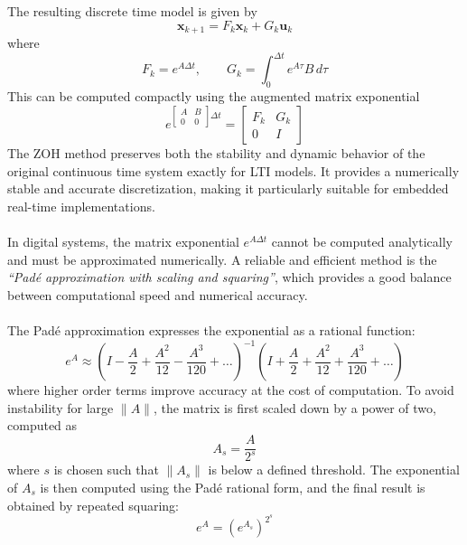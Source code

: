 \\ \\
The resulting discrete time model is given by
$$
    \mathbf{x}_{k+1} = F_k\mathbf{x}_k + G_k\mathbf{u}_k
$$
where
$$
    F_k = e^{A\Delta t}, \qquad
    G_k = \int_0^{\Delta t} e^{A\tau}B\,d\tau
$$
This can be computed compactly using the augmented matrix exponential
\begin{equation}
    e^{
        \begin{bmatrix}
            A & B \\ 
            0 & 0
        \end{bmatrix}
        \Delta t
        }
    =
    \begin{bmatrix}
        F_k & G_k \\
        0 & I
    \end{bmatrix}
    \label{eq:ZOH}
\end{equation}
The ZOH method preserves both the stability and dynamic behavior of the original continuous time system exactly for LTI models. It provides a numerically stable and accurate discretization, making it particularly suitable for embedded real-time implementations.  
\\ \\
In digital systems, the matrix exponential $e^{A\Delta t}$ cannot be computed analytically and must be approximated numerically. A reliable and efficient method is the \textit{``Padé approximation with scaling and squaring''}, which provides a good balance between computational speed and numerical accuracy.  
\\ \\
The Padé approximation expresses the exponential as a rational function:
\begin{equation}
    e^{A} \approx \left(I - \frac{A}{2} + \frac{A^2}{12} - \frac{A^3}{120} + \dots \right)^{-1}
                  \left(I + \frac{A}{2} + \frac{A^2}{12} + \frac{A^3}{120} + \dots \right)
    \label{eq:pade1}
\end{equation}
where higher order terms improve accuracy at the cost of computation. To avoid instability for large $\|A\|$, the matrix is first scaled down by a power of two, computed as
\begin{equation}
    A_s = \frac{A}{2^s}
    \label{eq:pade2}
\end{equation}
where $s$ is chosen such that $\|A_s\|$ is below a defined threshold. The exponential of $A_s$ is then computed using the Padé rational form, and the final result is obtained by repeated squaring:
\begin{equation}
    e^A = (e^{A_s})^{2^s}
    \label{eq:pade3}
\end{equation}

